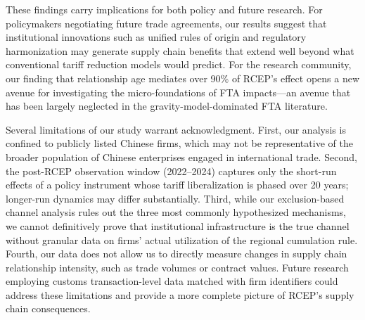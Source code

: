 \documentclass[preprint,12pt,authoryear]{elsarticle}
\begin{document}
These findings carry implications for both policy and future research. For policymakers negotiating future trade agreements, our results suggest that institutional innovations such as unified rules of origin and regulatory harmonization may generate supply chain benefits that extend well beyond what conventional tariff reduction models would predict. For the research community, our finding that relationship age mediates over 90\% of RCEP's effect opens a new avenue for investigating the micro-foundations of FTA impacts---an avenue that has been largely neglected in the gravity-model-dominated FTA literature.

Several limitations of our study warrant acknowledgment. First, our analysis is confined to publicly listed Chinese firms, which may not be representative of the broader population of Chinese enterprises engaged in international trade. Second, the post-RCEP observation window (2022--2024) captures only the short-run effects of a policy instrument whose tariff liberalization is phased over 20 years; longer-run dynamics may differ substantially. Third, while our exclusion-based channel analysis rules out the three most commonly hypothesized mechanisms, we cannot definitively prove that institutional infrastructure is the true channel without granular data on firms' actual utilization of the regional cumulation rule. Fourth, our data does not allow us to directly measure changes in supply chain relationship intensity, such as trade volumes or contract values. Future research employing customs transaction-level data matched with firm identifiers could address these limitations and provide a more complete picture of RCEP's supply chain consequences.
\end{document}

